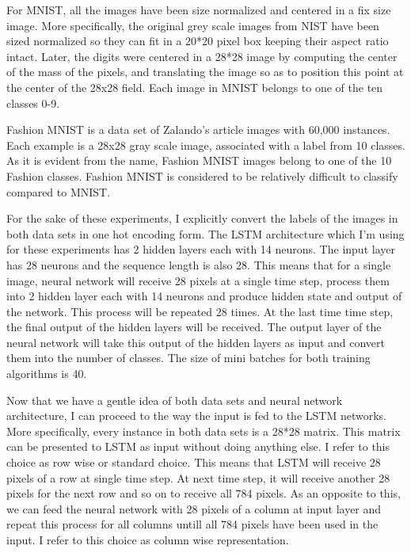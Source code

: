 For MNIST, all the images have been size normalized and centered in a fix size image. More specifically, the original grey scale images from NIST have been sized normalized so they can fit in a 20*20 pixel box keeping their aspect ratio intact. Later, the digits were centered in a 28*28 image by computing the center of the mass of the pixels, and translating the image so as to position this point at the center of the 28x28 field. Each image in MNIST belongs to one of the ten classes 0-9. 

Fashion MNIST is a data set of Zalando's article images with 60,000 instances. Each example is a 28x28 gray scale image, associated with a label from 10 classes. As it is evident from the name, Fashion MNIST images belong to one of the 10 Fashion classes. Fashion MNIST is considered to be relatively difficult to classify compared to MNIST.  

For the sake of these experiments, I explicitly convert the labels of the images in both data sets in one hot encoding form. The LSTM architecture which I'm using for these experiments has 2 hidden layers each with 14 neurons. The input layer has 28 neurons and the sequence length is also 28. This means that for a single image, neural network will receive 28 pixels at a single time step, process them into 2 hidden layer each with 14 neurons and produce hidden state and output of the network. This process will be repeated 28 times. At the last time time step, the final output of the hidden layers will be received. The output layer of the neural network will take this output of the hidden layers as input and convert them into the number of classes. The size of mini batches for both training algorithms is 40. 

Now that we have a gentle idea of both data sets and neural network architecture, I can proceed to the way the input is fed to the LSTM networks. More specifically, every instance in both data sets is a 28*28 matrix. This matrix can be presented to LSTM as input without doing anything else. I refer to this choice as row wise or standard choice. This means that LSTM will receive 28 pixels of a row at single time step. At next time step, it will receive another 28 pixels for the next row and so on to receive all 784 pixels. As an opposite to this, we can feed the neural network with 28 pixels of a column at input layer and repeat this process for all columns untill all 784 pixels have been used in the input. I refer to this choice as column wise representation.  



